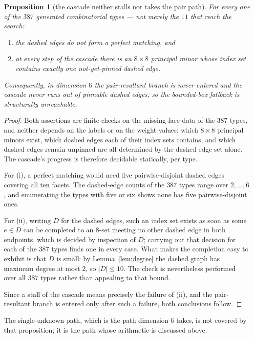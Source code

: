 \documentclass[11pt,reqno]{amsart}
\theoremstyle{plain}
\newtheorem{proposition}[theorem]{Proposition}
\theoremstyle{definition}
\newcommand{\NumTypes}{387}
\newcommand{\NumRequired}{11}
\begin{document}
\begin{proposition}[the cascade neither stalls nor takes the pair path]
\label{prop:cascade}
For every one of the $\NumTypes$ generated combinatorial types --- not merely the
$\NumRequired$ that reach the search:
\begin{enumerate}
\item[(i)] the dashed edges do not form a perfect matching, and
\item[(ii)] at every step of the cascade there is an $8\times8$ principal minor
      whose index set contains exactly one not-yet-pinned dashed edge.
\end{enumerate}
Consequently, in dimension $6$ the pair-resultant branch is never entered and the
cascade never runs out of pinnable dashed edges, so the bounded-box fallback is
structurally unreachable.
\end{proposition}
\begin{proof}
Both assertions are finite checks on the missing-face data of the $\NumTypes$
types, and neither depends on the labels or on the weight values: which $8\times8$
principal minors exist, which dashed edges each of their index sets contains, and
which dashed edges remain unpinned are all determined by the dashed-edge set alone.
The cascade's progress is therefore decidable statically, per type.

For (i), a perfect matching would need five pairwise-disjoint dashed edges
covering all ten facets. The dashed-edge counts of the $\NumTypes$ types range over
$2,\dots,6$, and enumerating the types with five or six shows none has five
pairwise-disjoint ones.

For (ii), writing $D$ for the dashed edges, such an index set exists as soon as some
$e\in D$ can be completed to an $8$-set meeting no other dashed edge in both
endpoints, which is decided by inspection of $D$; carrying out that decision for
each of the $\NumTypes$ types finds one in every case. What makes the completion
easy to exhibit is that $D$ is small: by Lemma~\ref{lem:degree} the dashed graph has
maximum degree at most $2$, so $|D|\le 10$. The check is nevertheless performed over
all $\NumTypes$ types rather than appealing to that bound.

Since a stall of the cascade means precisely the failure of (ii), and the
pair-resultant branch is entered only after such a failure, both conclusions
follow.
\end{proof}

The single-unknown path, which is the path dimension $6$ takes, is not covered by
that proposition; it is the path whose arithmetic is discussed above.
\end{document}
